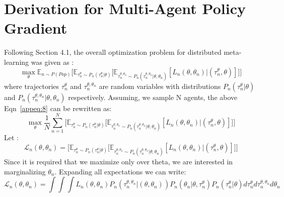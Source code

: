 \documentclass{article}
\begin{document}
\section{Derivation for Multi-Agent Policy Gradient}
Following Section 4.1, the overall optimization problem for distributed meta-learning was given as :
\begin{equation}
\label{appeq:8}
\max_{\theta} \mathbb{E}_{n \sim P(Pop)} \Big[ \mathbb{E}_{\tau_{n}^\theta \sim P_{n}(\tau^{\theta}_{n}|\theta)} \Big[ \mathbb{E}_{\tau_{n}^{\theta,\theta_n} \sim P_{n}(\tau_{n}^{\theta, \theta_n}|\theta,\theta_n)} [L_{n}(\theta,\theta_n)|(\tau_{n}^{\theta},\theta)] \Big] \Big]
\end{equation}
where trajectories $\tau_{n}^\theta$ and 
$\tau_{n}^{\theta,\theta_n}$ are random variables with distributions $P_{n}(\tau_{n}^\theta|\theta)$ and $P_n(\tau_{n}^{\theta,\theta_n}|\theta, \theta_n)$ respectively.
Assuming, we sample N agents, the above Eqn~\ref{appeq:8} can be rewritten as: 
\begin{equation}
\label{appeq:9}
\max_{\theta} \frac{1}{N}\sum_{n=1}^N \Big[ \mathbb{E}_{\tau_{n}^\theta \sim P_{n}(\tau^{\theta}_{n}|\theta)} \Big[ \mathbb{E}_{\tau_{n}^{\theta,\theta_n} \sim P_{n}(\tau_{n}^{\theta, \theta_n}|\theta,\theta_n)} [L_{n}(\theta,\theta_n)|(\tau_{n}^{\theta},\theta)] \Big] \Big]
\end{equation}
Let :
\begin{equation}
\label{appeq:10}
\mathcal{L}_n(\theta,\theta_n) = \Big[ \mathbb{E}_{\tau_{n}^\theta \sim P_{n}(\tau^{\theta}_{n}|\theta)} \Big[ \mathbb{E}_{\tau_{n}^{\theta,\theta_n} \sim P_{n}(\tau_{n}^{\theta, \theta_n}|\theta,\theta_n)} [L_{n}(\theta,\theta_n)|(\tau_{n}^{\theta},\theta)] \Big] \Big]
\end{equation}
Since it is required that we maximize only over theta, we are interested in marginalizing $\theta_n$. Expanding all expectations we can write:
\begin{equation}
\label{eq10}
\mathcal{L}_n(\theta,\theta_n) = \int \int \int L_{n}(\theta,\theta_n) P_n(\tau_n^{\theta,\theta_n}|(\theta,\theta_n))P_n(\theta_n|\theta,\tau_n^{\theta})P_n(\tau_n^{\theta}|\theta)d\tau_n^{\theta}d\tau_n^{\theta,\theta_n}d\theta_n
\end{equation}
\end{document}
